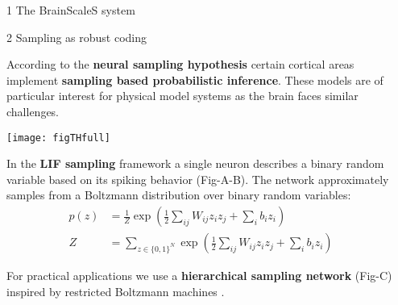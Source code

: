 \begin{frame}
\begin{columns}
\begin{column}{0.99\textwidth}
\begin{columns}[t]
\begin{column}{0.32\textwidth}
\begin{block}{\large 1 The BrainScaleS system}
\begin{adjustwidth}{1cm}{1cm}
					\end{adjustwidth}

					\blockSpaceOne
					\end{block}

					\interBlockSpaceOne

					\begin{block}{\large 2 Sampling as robust coding}
					\blockSpaceOne

					\begin{adjustwidth}{1.cm}{1.cm}
					\justifying
					According to the \textbf{neural sampling hypothesis} \cite{fiser2010statistically} certain cortical areas implement \textbf{sampling based probabilistic inference}.
					These models are of particular interest for physical model systems as the brain faces similar challenges.

					\vspace{.5cm}
					\begin{center}
						\texttt{[image: figTHfull]}
					\end{center}
					\vspace{.5cm}

					In the \textbf{LIF sampling} framework \cite{petrovici2016stochastic} a single neuron describes a binary random variable based on its spiking behavior (Fig-A-B).
					The network approximately samples from a Boltzmann distribution over binary random variables:
					\begin{align*}
					p(z) &= \frac{1}{Z} \exp \left ( \frac{1}{2} \sum_{ij} W_{ij} z_i z_j + \sum_{i} b_i z_i  \right) \\
					Z &= \sum_{z\in\{0,1\}^N} \exp \left ( \frac{1}{2} \sum_{ij} W_{ij} z_i z_j + \sum_{i} b_i z_i  \right)
					\end{align*}
					\end{adjustwidth}
					For practical applications we use a \textbf{hierarchical sampling network} (Fig-C) inspired by restricted Boltzmann machines \cite{hinton1984boltzmann}.



					\blockSpaceOne
					\end{block}





				\end{column}

				\begin{column}{.01\textwidth}\end{column}


\end{columns}
\end{column}
\end{columns}
\end{frame}
